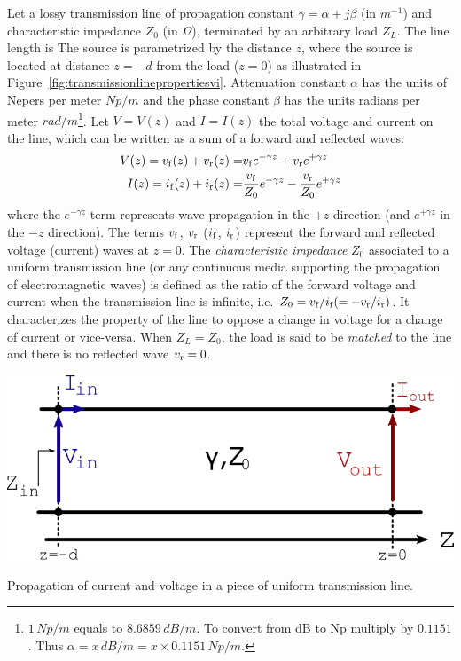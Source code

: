 Let a lossy transmission line of propagation constant $\gamma=\alpha+j\beta$ (in $\si{m^{-1}}$) and characteristic impedance $Z_0$ (in $\si{\Omega}$), terminated by an arbitrary load $Z_L$. The line length is The source is parametrized by the distance $z$, where the source is located at distance $z=-d$ from the load ($z=0$) as illustrated in Figure~\ref{fig:transmissionlinepropertiesvi}. Attenuation constant $\alpha$ has the units of Nepers per meter $\si{Np/m}$ and the phase constant $\beta$ has the units radians per meter $\si{rad/m}$\footnote{$1\,\si{Np/m}$ equals to $8.6859 \, \si{dB/m}$. To convert from \si{dB} to \si{Np} multiply by $0.1151$. Thus $\alpha = x \, \si{dB/m} = x \times 0.1151 \, \si{Np/m}$.}. Let $V=V(z)$ and $I=I(z)$ the total voltage and current on the line, which can be written as a sum of a forward and reflected waves:
\begin{subequations}
\begin{align}
	V(z) = {v_{\mathrm{f}}}(z) + {v_{\mathrm{r}}}(z) =& {v_{\mathrm{f}}} e^{-\gamma z} + {v_{\mathrm{r}}} e^{+\gamma z} \\
	I(z) = {i_{\mathrm{f}}}(z) + {i_{\mathrm{r}}}(z) =& \frac{{v_{\mathrm{f}}}}{Z_0} e^{-\gamma z} - \frac{{v_{\mathrm{r}}}}{Z_0} e^{+\gamma z}
\end{align}
	\label{eq:voltage_current_lossy_line}
\end{subequations}
where the $e^{-\gamma z}$ term represents wave propagation in the $+z$ direction (and $e^{+\gamma z}$ in the $-z$ direction). The terms ${v_{\mathrm{f}}}$, ${v_{\mathrm{r}}}$ (${i_{\mathrm{f}}}$, ${i_{\mathrm{r}}}$) represent the forward and reflected voltage (current) waves at $z=0$.  
The \textit{characteristic impedance} $Z_0$ associated to a uniform transmission line (or any continuous media supporting the propagation of electromagnetic waves) is defined as the ratio of the forward voltage and current when the transmission line is infinite, i.e.  $Z_0={v_{\mathrm{f}}}/{i_{\mathrm{f}}}(=-{v_{\mathrm{r}}}/{i_{\mathrm{r}}})$. It characterizes the property of the line to oppose a change in voltage for a change of current or vice-versa. When $Z_L=Z_0$, the load is said to be \textit{matched} to the line and there is no reflected wave ${v_{\mathrm{r}}}=0$.

\begin{marginfigure}[-2cm]
	\includegraphics[width=1\linewidth]{figures/chap3/transmission_line_transfer}
	\caption{Propagation of current and voltage in a piece of uniform transmission line.}
	\label{fig:transmission_line_transfer}
\end{marginfigure}

